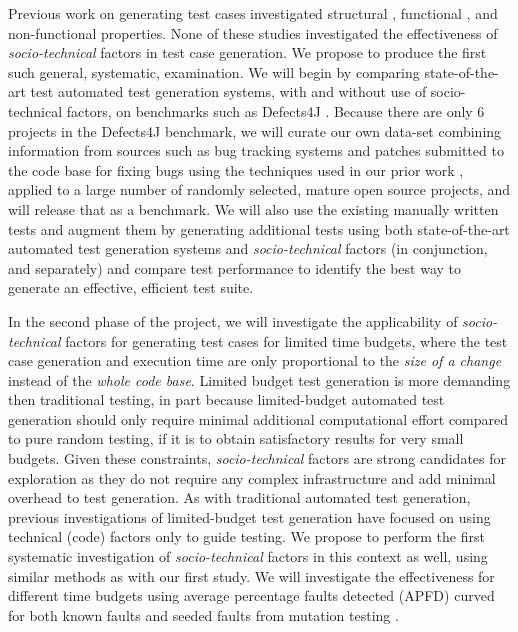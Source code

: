 \documentclass[10pt]{article}
\begin{document}
 Previous work on generating test cases investigated structural \cite{tonella2004evolutionary}, functional \cite{wegener2004evaluation}, and non-functional \cite{wegener1998verifying} properties. %
None of these studies investigated the effectiveness of \emph{socio-technical} factors in test case generation. We propose to produce the first such general, systematic, examination. We will begin by comparing state-of-the-art test automated test generation systems, with and without use of socio-technical factors, on benchmarks such as Defects4J \cite{just2014defects4j}.  Because there are only 6 projects in the Defects4J benchmark, we will curate our own data-set combining information from  sources such as bug tracking systems and patches submitted to the code base for fixing bugs using the techniques used in our prior work \cite{ahmed2016can}, applied to a large number of randomly selected, mature open source projects, and will release that as a benchmark.  We will also use the existing manually written tests and augment them by generating additional tests using both state-of-the-art automated test generation systems and \emph{socio-technical} factors (in conjunction, and separately) and compare test performance to identify the best way to generate an effective, efficient test suite.

 In the second phase of the project, we will investigate the applicability of \emph{socio-technical} factors for generating test cases for limited time budgets, where the test case generation and execution time are only proportional to the \emph{size of a change} instead of the \emph{whole code base}. Limited budget test generation is more demanding then traditional testing, in part because limited-budget automated test generation should only require minimal additional computational effort compared to pure random testing, if it is to obtain satisfactory results for very small budgets. Given these constraints, \emph{socio-technical} factors are strong candidates for exploration as they do not require any complex infrastructure and add minimal overhead to test generation.  As with traditional automated test generation, previous investigations of limited-budget test generation \cite{groce2012lightweight} have focused on using technical (code) factors only to guide testing. We propose to perform the first systematic investigation of \emph{socio-technical} factors in this context as well, using similar methods as with our first study.  
We will investigate the effectiveness for different time budgets using average percentage faults detected (APFD) \cite{elbaum2002test} curved for both known faults and seeded faults from mutation testing \cite{ahmed2017applying}.
\end{document}
